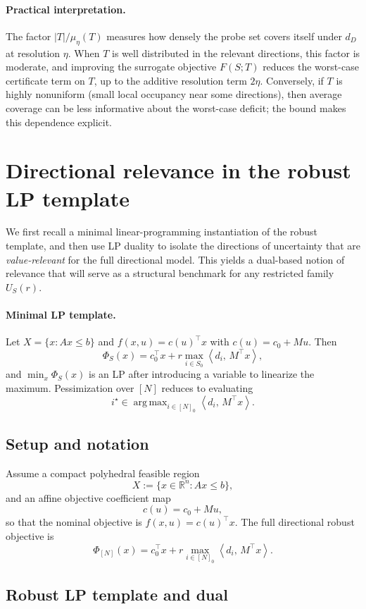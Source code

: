 \documentclass[accepted]{uai2026}
\theoremstyle{plain}
\theoremstyle{definition}
\theoremstyle{remark}
\newcommand{\ip}[2]{\left\langle #1 ,\, #2 \right\rangle}
\DeclareMathOperator*{\argmax}{arg\,max}
\begin{document}
\paragraph{Practical interpretation.}
The factor $|T|/\mu_\eta(T)$ measures how densely the probe set covers itself under $d_D$ at resolution $\eta$. When $T$ is well distributed in the relevant directions, this factor is moderate, and improving the surrogate objective $F(S;T)$ reduces the worst-case certificate term on $T$, up to the additive resolution term $2\eta$. Conversely, if $T$ is highly nonuniform (small local occupancy near some directions), then average coverage can be less informative about the worst-case deficit; the bound makes this dependence explicit.




\section{Directional relevance in the robust LP template}
\label{sec:dir-rel-lp}

We first recall a minimal linear-programming instantiation of the robust template, and then use LP duality to isolate the directions of uncertainty that are \emph{value-relevant} for the full directional model. This yields a dual-based notion of relevance that will serve as a structural benchmark for any restricted family $U_S(r)$.

\paragraph{Minimal LP template.}
Let $X=\{x:Ax\le b\}$ and $f(x,u)=c(u)^\top x$ with $c(u)=c_0+Mu$. Then
\[
\Phi_S(x)=c_0^\top x + r\max_{i\in S_0}\ip{d_i}{M^\top x},
\]
and $\min_x \Phi_S(x)$ is an LP after introducing a variable to linearize the maximum. Pessimization over $[N]$ reduces to evaluating
\[
i^\star\in\argmax_{i\in [N]_0}\ip{d_i}{M^\top x}.
\]

\subsection{Setup and notation}
Assume a compact polyhedral feasible region
\[
X := \{x\in\mathbb{R}^n : Ax \le b\},
\]
and an affine objective coefficient map
\[
c(u) = c_0 + Mu,
\]
so that the nominal objective is $f(x,u)=c(u)^\top x$. The full directional robust objective is
\[
\Phi_{[N]}(x)=c_0^\top x + r\max_{i\in [N]_0}\ip{d_i}{M^\top x}.
\]

\subsection{Robust LP template and dual}
\end{document}
